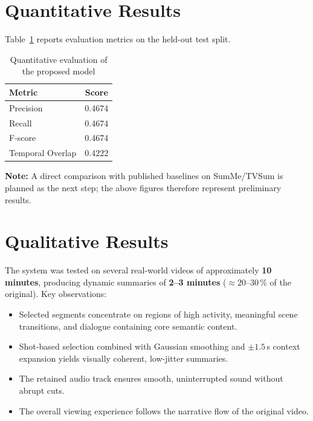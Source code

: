\documentclass[12pt, a4paper]{report}
\begin{document}
\section{Quantitative Results}

Table~\ref{tab:quantitative} reports evaluation metrics on the held-out test split.

\begin{table}[H]
\centering
\caption{Quantitative evaluation of the proposed model}
\label{tab:quantitative}
\begin{tabular}{lc}
  \toprule
  \textbf{Metric} & \textbf{Score} \\
  \midrule
  Precision         & 0.4674 \\
  Recall            & 0.4674 \\
  F-score           & 0.4674 \\
  Temporal Overlap  & 0.4222 \\
  \bottomrule
\end{tabular}
\end{table}

\noindent
\textbf{Note:} A direct comparison with published baselines on SumMe/TVSum
\cite{apostolidis2021,zhang2016} is planned as the next step; the above figures
therefore represent preliminary results.

\section{Qualitative Results}

The system was tested on several real-world videos of approximately \textbf{10 minutes},
producing dynamic summaries of \textbf{2--3 minutes} ($\approx 20$--$30\,\%$ of the
original). Key observations:

\begin{itemize}
  \item Selected segments concentrate on regions of high activity, meaningful scene
        transitions, and dialogue containing core semantic content.
  \item Shot-based selection combined with Gaussian smoothing and $\pm 1.5$\,s context
        expansion yields visually coherent, low-jitter summaries.
  \item The retained audio track ensures smooth, uninterrupted sound without abrupt cuts.
  \item The overall viewing experience follows the narrative flow of the original video.
\end{itemize}
\end{document}
